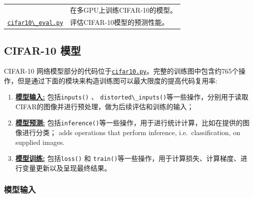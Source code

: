 \begin{longtable}[c]{@{}ll@{}}
\begin{minipage}[t]{0.05\columnwidth}
\strut\end{minipage} &
\begin{minipage}[t]{0.05\columnwidth}\raggedright\strut
在多GPU上训练CIFAR-10的模型。
\strut\end{minipage}\tabularnewline
\begin{minipage}[t]{0.05\columnwidth}\raggedright\strut
\href{https://tensorflow.googlesource.com/tensorflow/+/master/tensorflow/models/image/cifar10/cifar10_eval.py}{\lstinline{cifar10\_eval.py}}
\strut\end{minipage} &
\begin{minipage}[t]{0.05\columnwidth}\raggedright\strut
评估CIFAR-10模型的预测性能。
\strut\end{minipage}\tabularnewline
\bottomrule
\end{longtable}

\subsection{CIFAR-10 模型 }\label{cifar-10-ux6a21ux578b}

CIFAR-10 网络模型部分的代码位于\href{https://tensorflow.googlesource.com/tensorflow/+/master/tensorflow/models/image/cifar10/cifar10.py}{\lstinline{cifar10.py}}。完整的训练图中包含约765个操作，但是通过下面的模块来构造训练图可以最大限度的提高代码复用率:

\begin{enumerate}
\def\labelenumi{\arabic{enumi}.}
\tightlist
\item
  \protect\hyperlink{model-inputs}{\textbf{模型输入:}}
  包括\lstinline{inputs()} 、
  \lstinline{distorted\_inputs()}等一些操作，分别用于读取CIFAR的图像并进行预处理，做为后续评估和训练的输入；
\item
  \protect\hyperlink{model-prediction}{\textbf{模型预测:}}
  包括\lstinline{inference()}等一些操作，用于进行统计计算，比如在提供的图像进行分类；
  adds operations that perform inference, i.e.~classification, on
  supplied images.
\item
  \protect\hyperlink{model-training}{\textbf{模型训练:}}
  包括\lstinline{loss()} 和
  \lstinline{train()}等一些操作，用于计算损失、计算梯度、进行变量更新以及呈现最终结果。
\end{enumerate}

\subsubsection{模型输入 }\label{ux6a21ux578bux8f93ux5165}

